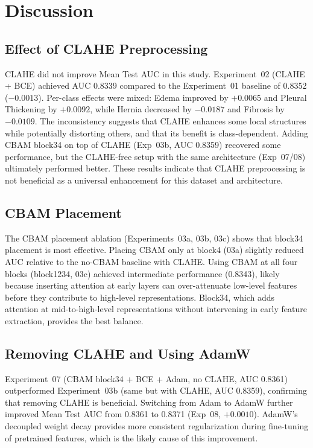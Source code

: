 \section{Discussion}

\subsection{Effect of CLAHE Preprocessing}

CLAHE did not improve Mean Test AUC in this study.
Experiment~02 (CLAHE + BCE) achieved AUC 0.8339 compared to the Experiment~01 baseline of 0.8352 ($-0.0013$).
Per-class effects were mixed: Edema improved by $+0.0065$ and Pleural Thickening by $+0.0092$, while Hernia decreased by $-0.0187$ and Fibrosis by $-0.0109$.
The inconsistency suggests that CLAHE enhances some local structures while potentially distorting others, and that its benefit is class-dependent.
Adding CBAM block34 on top of CLAHE (Exp~03b, AUC 0.8359) recovered some performance, but the CLAHE-free setup with the same architecture (Exp~07/08) ultimately performed better.
These results indicate that CLAHE preprocessing is not beneficial as a universal enhancement for this dataset and architecture.

\subsection{CBAM Placement}

The CBAM placement ablation (Experiments~03a, 03b, 03c) shows that block34 placement is most effective.
Placing CBAM only at block4 (03a) slightly reduced AUC relative to the no-CBAM baseline with CLAHE.
Using CBAM at all four blocks (block1234, 03c) achieved intermediate performance (0.8343), likely because inserting attention at early layers can over-attenuate low-level features before they contribute to high-level representations.
Block34, which adds attention at mid-to-high-level representations without intervening in early feature extraction, provides the best balance.

\subsection{Removing CLAHE and Using AdamW}

Experiment~07 (CBAM block34 + BCE + Adam, no CLAHE, AUC 0.8361) outperformed Experiment~03b (same but with CLAHE, AUC 0.8359), confirming that removing CLAHE is beneficial.
Switching from Adam to AdamW further improved Mean Test AUC from 0.8361 to 0.8371 (Exp~08, $+0.0010$).
AdamW's decoupled weight decay provides more consistent regularization during fine-tuning of pretrained features, which is the likely cause of this improvement.

